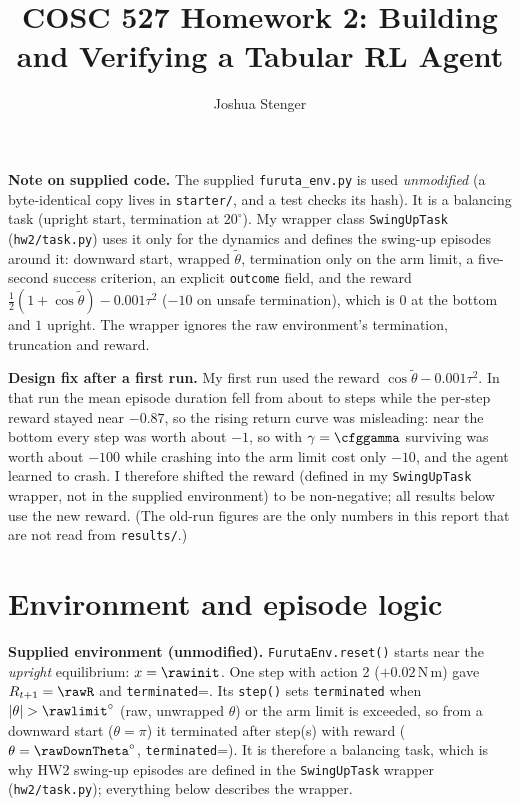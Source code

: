 \documentclass[11pt]{article}
\title{COSC 527 Homework 2: Building and Verifying a Tabular RL Agent}
\author{Joshua Stenger}
\date{}
\begin{document}
\maketitle

\noindent\textbf{Note on supplied code.} The supplied \texttt{furuta\_env.py} is used \emph{unmodified} (a byte-identical copy lives in \texttt{starter/}, and a test checks its hash). It is a balancing task (upright start, termination at $20^\circ$). My wrapper class \texttt{SwingUpTask} (\texttt{hw2/task.py}) uses it only for the dynamics and defines the swing-up episodes around it: downward start, wrapped $\widetilde\theta$, termination only on the arm limit, a five-second success criterion, an explicit \texttt{outcome} field, and the reward $\tfrac12(1+\cos\widetilde\theta)-0.001\tau^2$ ($-10$ on unsafe termination), which is $0$ at the bottom and $1$ upright. The wrapper ignores the raw environment's termination, truncation and reward.

\noindent\textbf{Design fix after a first run.} My first run used the reward $\cos\widetilde\theta-0.001\tau^2$. In that run the mean episode duration fell from about \oldDurFrom{} to \oldDurTo{} steps while the per-step reward stayed near $-0.87$, so the rising return curve was misleading: near the bottom every step was worth about $-1$, so with $\gamma=\cfggamma$ surviving was worth about $-100$ while crashing into the arm limit cost only $-10$, and the agent learned to crash. I therefore shifted the reward (defined in my \texttt{SwingUpTask} wrapper, not in the supplied environment) to be non-negative; all results below use the new reward. (The old-run figures are the only numbers in this report that are not read from \texttt{results/}.)

\section{Environment and episode logic}
\textbf{Supplied environment (unmodified).} \texttt{FurutaEnv.reset()} starts near the \emph{upright} equilibrium: $x=\rawinit$. One step with action 2 ($+0.02$\,N\,m) gave $R_{t+1}=\rawR$ and \texttt{terminated}=\rawTerm. Its \texttt{step()} sets \texttt{terminated} when $|\theta|>\rawlimit^\circ$ (raw, unwrapped $\theta$) or the arm limit is exceeded, so from a downward start ($\theta=\pi$) it terminated after \rawDownSteps{} step(s) with reward \rawDownReward{} ($\theta=\rawDownTheta^\circ$, \texttt{terminated}=\rawDownTerm). It is therefore a balancing task, which is why HW2 swing-up episodes are defined in the \texttt{SwingUpTask} wrapper (\texttt{hw2/task.py}); everything below describes the wrapper.
\end{document}
